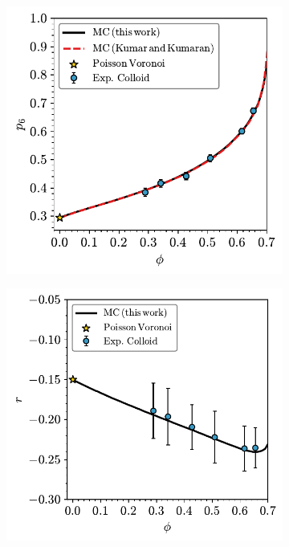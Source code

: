 \begin{figure}[bt]
     \centering
     
      \begin{subfigure}[b]{0.45\textwidth}
         \centering
         \includegraphics[width=\textwidth]{./figures/quasi2d/mono_phi_p6.pdf}
         \caption{}
         \label{fig:mono1}
     \end{subfigure}
     \hfill
       \begin{subfigure}[b]{0.48\textwidth}
         \centering
         \includegraphics[width=\textwidth]{./figures/quasi2d/mono_phi_r.pdf}
         \caption{}
         \label{fig:mono2}
     \end{subfigure}
     \hfill
    

\end{figure}

